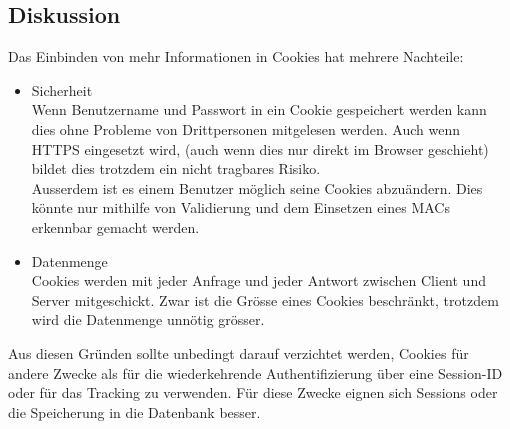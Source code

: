 \subsection*{Diskussion}
Das Einbinden von mehr Informationen in Cookies hat mehrere Nachteile:
\begin{itemize}
	\item Sicherheit \\
		Wenn Benutzername und Passwort in ein Cookie gespeichert werden kann dies ohne Probleme von Drittpersonen mitgelesen werden. Auch wenn HTTPS eingesetzt wird, (auch wenn dies nur direkt im Browser geschieht) bildet dies trotzdem ein nicht tragbares Risiko. \\
		Ausserdem ist es einem Benutzer möglich seine Cookies abzuändern. Dies könnte nur mithilfe von Validierung und dem Einsetzen eines \glspl{MAC} erkennbar gemacht werden.
	\item Datenmenge \\
		Cookies werden mit jeder Anfrage und jeder Antwort zwischen Client und Server mitgeschickt. Zwar ist die Grösse eines Cookies beschränkt, trotzdem wird die Datenmenge unnötig grösser.
\end{itemize}

Aus diesen Gründen sollte unbedingt darauf verzichtet werden, Cookies für andere Zwecke als für die wiederkehrende Authentifizierung über eine Session-ID oder für das Tracking zu verwenden. Für diese Zwecke eignen sich Sessions oder die Speicherung in die Datenbank besser.